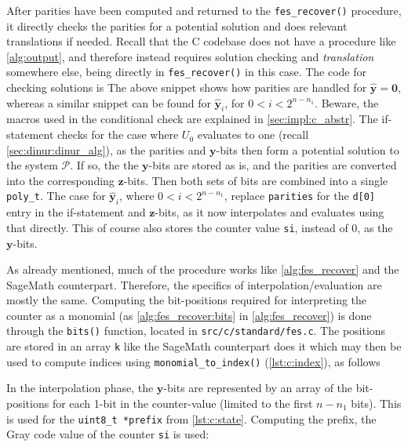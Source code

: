 After parities have been computed and returned to the \texttt{fes\_recover()} procedure, it directly checks the parities for a potential solution and does relevant translations if needed. Recall that the C codebase does not have a procedure like \cref{alg:output}, and therefore instead requires solution checking and \textit{translation} somewhere else, being directly in \texttt{fes\_recover()} in this case. The code for checking solutions is 
The above snippet shows how parities are handled for $\hat{\mathbf{y}} = \mathbf{0}$, whereas a similar snippet can be found for $\hat{\mathbf{y}}_i$, for $0 < i < 2^{n - n_1}$. Beware, the macros used in the conditional check are explained in \cref{sec:impl:c_abstr}. The if-statement checks for the case where $U_0$ evaluates to one (recall \cref{sec:dinur:dinur_alg}), as the parities and $\mathbf{y}$-bits then form a potential solution to the system $\mathcal{P}$. If so, the the $\mathbf{y}$-bits are stored as is, and the parities are converted into the corresponding $\mathbf{z}$-bits. Then both sets of bits are combined into a single \texttt{poly\_t}. The case for $\hat{\mathbf{y}}_i$, where $0 < i < 2^{n - n_1}$, replace \texttt{parities} for the \texttt{d[0]} entry in the if-statement and $\mathbf{z}$-bits, as it now interpolates and evaluates using that directly. This of course also stores the counter value \texttt{si}, instead of 0, as the $\mathbf{y}$-bits. 

As already mentioned, much of the procedure works like \cref{alg:fes_recover} and the SageMath counterpart. Therefore, the specifics of interpolation/evaluation are mostly the same. Computing the bit-positions required for interpreting the counter as a monomial (as \cref{alg:fes_recover:bits} in \cref{alg:fes_recover}) is done through the \texttt{bits()} function, located in \texttt{src/c/standard/fes.c}. The positions are stored in an array \texttt{k} like the SageMath counterpart does it 
which may then be used to compute indices using \texttt{monomial\_to\_index()} (\cref{lst:c:index}), as follows

In the interpolation phase, the $\mathbf{y}$-bits are represented by an array of the bit-positions for each 1-bit in the counter-value (limited to the first $n - n_1$ bits). This is used for the \texttt{uint8\_t *prefix} from \cref{lst:c:state}. Computing the prefix, the Gray code value of the counter \texttt{si} is used:

